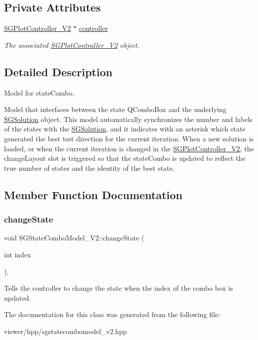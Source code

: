 \subsection*{Private Attributes}
\begin{DoxyCompactItemize}
\item 
\mbox{\label{classSGStateComboModel__V2_a3dba3a97b834e0af00568862cb67653c}} 
\hyperlink{classSGPlotController__V2}{S\+G\+Plot\+Controller\+\_\+\+V2} $\ast$ \hyperlink{classSGStateComboModel__V2_a3dba3a97b834e0af00568862cb67653c}{controller}
\begin{DoxyCompactList}\small\item\em The associated \hyperlink{classSGPlotController__V2}{S\+G\+Plot\+Controller\+\_\+\+V2} object. \end{DoxyCompactList}\end{DoxyCompactItemize}


\subsection{Detailed Description}
Model for state\+Combo. 

Model that interfaces between the state Q\+Combo\+Box and the underlying \hyperlink{classSGSolution}{S\+G\+Solution} object. This model automatically synchronizes the number and labels of the states with the \hyperlink{classSGSolution}{S\+G\+Solution}, and it indicates with an asterisk which state generated the best test direction for the current iteration. When a new solution is loaded, or when the current iteration is changed in the \hyperlink{classSGPlotController__V2}{S\+G\+Plot\+Controller\+\_\+\+V2}, the change\+Layout slot is triggered so that the state\+Combo is updated to reflect the true number of states and the identity of the best state. 

\subsection{Member Function Documentation}
\mbox{\label{classSGStateComboModel__V2_a88d15de602377d88c1e1dfcc9f6e27e4}} 
\subsubsection{\texorpdfstring{change\+State}{changeState}}
{\footnotesize\ttfamily void S\+G\+State\+Combo\+Model\+\_\+\+V2\+::change\+State (\begin{DoxyParamCaption}\item[{int}]{index }\end{DoxyParamCaption})\hspace{0.3cm}{\ttfamily [inline]}, {\ttfamily [slot]}}

Tells the controller to change the state when the index of the combo box is updated. 

The documentation for this class was generated from the following file\+:\begin{DoxyCompactItemize}
\item 
viewer/hpp/sgstatecombomodel\+\_\+v2.\+hpp\end{DoxyCompactItemize}
